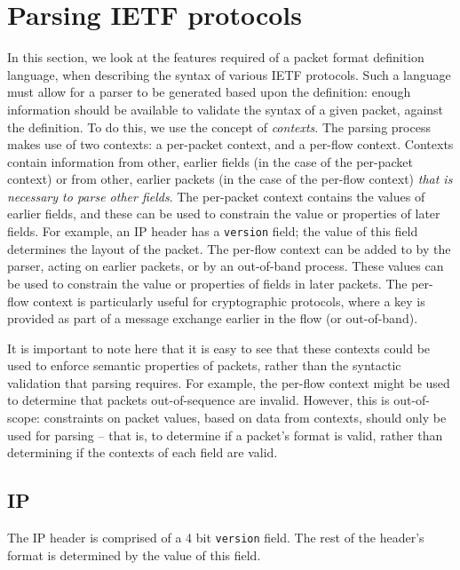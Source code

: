 \documentclass[10pt,a4paper]{article}
\begin{document}
\section{Parsing IETF protocols}

In this section, we look at the features required of a packet format definition language,
when describing the syntax of various IETF protocols. Such a language must allow for a
parser to be generated based upon the definition: enough information should be available
to validate the syntax of a given packet, against the definition. To do this, we use the
concept of \emph{contexts}. The parsing process makes use of two contexts: a per-packet
context, and a per-flow context. Contexts contain information from other, earlier fields
(in the case of the per-packet context) or from other, earlier packets (in the case of the
per-flow context) \emph{that is necessary to parse other fields}. The per-packet context
contains the values of earlier fields, and these can be used to constrain the value or
properties of later fields. For example, an IP header has a \texttt{version} field; the
value of this field determines the layout of the packet. The per-flow context can be
added to by the parser, acting on earlier packets, or by an out-of-band process. These
values can be used to constrain the value or properties of fields in later packets. The
per-flow context is particularly useful for cryptographic protocols, where a key is
provided as part of a message exchange earlier in the flow (or out-of-band).

It is important to note here that it is easy to see that these contexts could be used to
enforce semantic properties of packets, rather than the syntactic validation that parsing
requires. For example, the per-flow context might be used to determine that packets
out-of-sequence are invalid. However, this is out-of-scope: constraints on packet values,
based on data from contexts, should only be used for parsing -- that is, to determine if
a packet's format is valid, rather than determining if the contexts of each field are
valid.

\subsection{IP}

The IP header is comprised of a 4 bit \texttt{version} field. The rest of the header's
format is determined by the value of this field.
\end{document}
